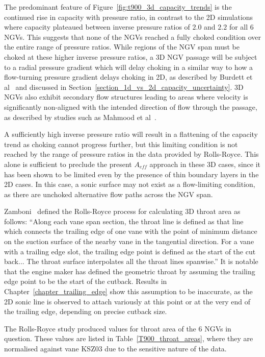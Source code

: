 \documentclass[a4paper, 11pt, oneside]{report}
\begin{document}
The predominant feature of Figure~\ref{fig:t900_3d_capacity_trends} is the continued rise in capacity with pressure ratio, in contrast to the 2D simulations where capacity plateaued between inverse pressure ratios of $2.0$ and $2.2$ for all $6$ NGVs. This suggests that none of the NGVs reached a fully choked condition over the entire range of pressure ratios. While regions of the NGV span must be choked at these higher inverse pressure ratios, a 3D NGV passage will be subject to a radial pressure gradient which will delay choking in a similar way to how a flow-turning pressure gradient delays choking in 2D, as described by Burdett et al~\cite{burdett_capacity} and discussed in Section~\ref{section_1d_vs_2d_capacity_uncertainty}. 3D NGVs also exhibit secondary flow structures leading to areas where velocity is significantly non-aligned with the intended direction of flow through the passage, as described by studies such as Mahmood et al~\cite{mahmood_secondary_flows}. 

A sufficiently high inverse pressure ratio will result in a flattening of the capacity trend as choking cannot progress further, but this limiting condition is not reached by the range of pressure ratios in the data provided by Rolls-Royce. This alone is sufficient to preclude the present $A_{eff}$ approach in these 3D cases, since it has been shown to be limited even by the presence of thin boundary layers in the 2D cases. In this case, a sonic surface may not exist as a flow-limiting condition, as there are unchoked alternative flow paths across the NGV span.

Zamboni~\cite{zamboni_area} defined the Rolls-Royce process for calculating 3D throat area as follows: ``Along each vane span section, the throat line is defined as that line which connects the trailing edge of one vane with the point of minimum distance on the suction surface of the nearby vane in the tangential direction. For a vane with a trailing edge slot, the trailing edge point is defined as the start of the cut back... The throat surface interpolates all the throat lines spanwise.'' It is notable that the engine maker has defined the geometric throat by assuming the trailing edge point to be the start of the cutback. Results in Chapter~\ref{chapter_trailing_edge} show this assumption to be inaccurate, as the 2D sonic line is observed to attach variously at this point or at the very end of the trailing edge, depending on precise cutback size.

The Rolls-Royce study produced values for throat area of the 6 NGVs in question. These values are listed in Table~\ref{T900_throat_areas}, where they are normalised against vane KSZ03 due to the sensitive nature of the data.
\end{document}
